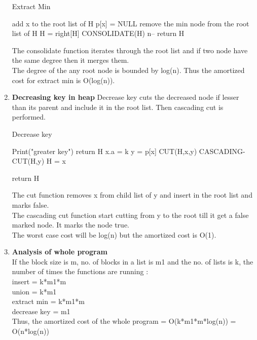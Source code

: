 \documentclass[a4paper,11pt]{article}
\begin{document}
\begin{enumerate}
  \begin{algorithm}
    \caption{Extract Min}
    \begin{algorithmic}[1]
            \State add x to the root list of H
            \State p[x] = NULL
        \EndFor
        \State remove the min node from the root list of H
        \State H = right[H]
        \State CONSOLIDATE(H)
        \State n--
    \EndIf
    \State return H
    \end{algorithmic}
  \end{algorithm}

The consolidate function iterates through the root list and if two node have the same degree then it merges them.\\
The degree of the any root node is bounded by log(n). Thus the amortized cost for extract min is O(log(n)).

 \item \textbf{Decreasing key in heap}
Decrease key cuts the decreased node if lesser than its parent and include it in the root list. Then cascading cut is performed.

  \begin{algorithm}
    \caption{Decrease key}
    \begin{algorithmic}[1]
        \State Print("greater key")
        \State return H
    \EndIf
    \State x.a = k
    \State y = p[x]
        \State CUT(H,x,y)
        \State CASCADING-CUT(H,y)
    \EndIf
        \State H = x
\end{algorithmic}
\end{algorithm}

\begin{algorithm}                     
\begin{algorithmic} [1]
    \EndIf
    \State return H
    \end{algorithmic}
  \end{algorithm}

The cut function removes x from child list of y and insert in the root list and marks false.\\
The cascading cut function start cutting from y to the root till it get a false marked node. It marks the node true.\\
The worst case cost will be log(n) but the amortized cost is O(1).

\item \textbf{Analysis of whole program}\\
If the block size is m, no. of blocks in a list is m1 and the no. of lists is k, the number of times the functions are running :\\
insert = k*m1*m\\
union = k*m1\\
extract min = k*m1*m\\
decrease key = m1\\
Thus, the amortized cost of the whole program = O(k*m1*m*log(n)) = O(n*log(n))

\end{enumerate}
\end{document}
